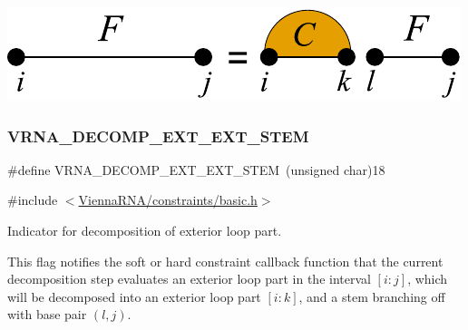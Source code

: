  
\begin{DoxyImageNoCaption}
  \mbox{\includegraphics[width=\textwidth,height=\textheight/2,keepaspectratio=true]{decomp_ext_stem_ext}}
\end{DoxyImageNoCaption}
 \mbox{\label{group__constraints_ga06efd054c9271438f6d82d4559d9e69f}} 
\subsubsection{\texorpdfstring{V\+R\+N\+A\+\_\+\+D\+E\+C\+O\+M\+P\+\_\+\+E\+X\+T\+\_\+\+E\+X\+T\+\_\+\+S\+T\+EM}{VRNA\_DECOMP\_EXT\_EXT\_STEM}}
{\footnotesize\ttfamily \#define V\+R\+N\+A\+\_\+\+D\+E\+C\+O\+M\+P\+\_\+\+E\+X\+T\+\_\+\+E\+X\+T\+\_\+\+S\+T\+EM~(unsigned char)18}



{\ttfamily \#include $<$\hyperlink{constraints_2basic_8h}{Vienna\+R\+N\+A/constraints/basic.\+h}$>$}



Indicator for decomposition of exterior loop part. 

This flag notifies the soft or hard constraint callback function that the current decomposition step evaluates an exterior loop part in the interval $[i:j]$, which will be decomposed into an exterior loop part $[i:k]$, and a stem branching off with base pair $(l,j)$.

